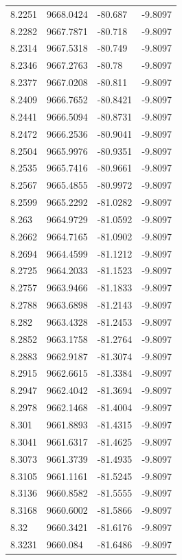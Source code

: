 \begin{table}[H]
\begin{tabular}{llll}
8.2251 & 9668.0424 & -80.687 & -9.8097 \\
8.2282 & 9667.7871 & -80.718 & -9.8097 \\
8.2314 & 9667.5318 & -80.749 & -9.8097 \\
8.2346 & 9667.2763 & -80.78 & -9.8097 \\
8.2377 & 9667.0208 & -80.811 & -9.8097 \\
8.2409 & 9666.7652 & -80.8421 & -9.8097 \\
8.2441 & 9666.5094 & -80.8731 & -9.8097 \\
8.2472 & 9666.2536 & -80.9041 & -9.8097 \\
8.2504 & 9665.9976 & -80.9351 & -9.8097 \\
8.2535 & 9665.7416 & -80.9661 & -9.8097 \\
8.2567 & 9665.4855 & -80.9972 & -9.8097 \\
8.2599 & 9665.2292 & -81.0282 & -9.8097 \\
8.263 & 9664.9729 & -81.0592 & -9.8097 \\
8.2662 & 9664.7165 & -81.0902 & -9.8097 \\
8.2694 & 9664.4599 & -81.1212 & -9.8097 \\
8.2725 & 9664.2033 & -81.1523 & -9.8097 \\
8.2757 & 9663.9466 & -81.1833 & -9.8097 \\
8.2788 & 9663.6898 & -81.2143 & -9.8097 \\
8.282 & 9663.4328 & -81.2453 & -9.8097 \\
8.2852 & 9663.1758 & -81.2764 & -9.8097 \\
8.2883 & 9662.9187 & -81.3074 & -9.8097 \\
8.2915 & 9662.6615 & -81.3384 & -9.8097 \\
8.2947 & 9662.4042 & -81.3694 & -9.8097 \\
8.2978 & 9662.1468 & -81.4004 & -9.8097 \\
8.301 & 9661.8893 & -81.4315 & -9.8097 \\
8.3041 & 9661.6317 & -81.4625 & -9.8097 \\
8.3073 & 9661.3739 & -81.4935 & -9.8097 \\
8.3105 & 9661.1161 & -81.5245 & -9.8097 \\
8.3136 & 9660.8582 & -81.5555 & -9.8097 \\
8.3168 & 9660.6002 & -81.5866 & -9.8097 \\
8.32 & 9660.3421 & -81.6176 & -9.8097 \\
8.3231 & 9660.084 & -81.6486 & -9.8097 \\

\end{tabular}
\end{table}
